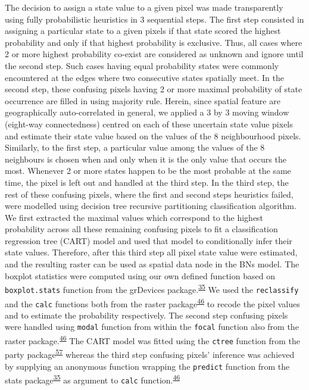 \documentclass[12pt,oneside]{article}
\begin{document}
The decision to assign a state value to a given pixel was made
transparently using fully probabilistic heuristics in 3 sequential
steps. The first step consisted in assigning a particular state to a
given pixels if that state scored the highest probability and only if
that highest probability is exclusive. Thus, all cases where 2 or more
highest probability co-exist are considered as unknown and ignore until
the second step. Such cases having equal probability states were
commonly encountered at the edges where two consecutive states spatially
meet. In the second step, these confusing pixels having 2 or more
maximal probability of state occurrence are filled in using majority
rule. Herein, since spatial feature are geographically auto-correlated
in general, we applied a 3 by 3 moving window (eight-way connectedness)
centred on each of these uncertain state value pixels and estimate their
state value based on the values of the 8 neighbourhood pixels.
Similarly, to the first step, a particular value among the values of the
8 neighbours is chosen when and only when it is the only value that
occurs the most. Whenever 2 or more states happen to be the most
probable at the same time, the pixel is left out and handled at the
third step. In the third step, the rest of these confusing pixels, where
the first and second steps heuristics failed, were modelled using
decision tree recursive partitioning classification algorithm. We first
extracted the maximal values which correspond to the highest probability
across all these remaining confusing pixels to fit a classification
regression tree (CART) model and used that model to conditionally infer
their state values. Therefore, after this third step all pixel state
value were estimated, and the resulting raster can be used as spatial
data node in the BNs model. The boxplot statistics were computed using
our own defined function based on \texttt{boxplot.stats} function from
the grDevices
package.\textsuperscript{\protect\hyperlink{ref-RCoreTeam_2018}{35}} We
used the \texttt{reclassify} and the \texttt{calc} functions both from
the raster
package\textsuperscript{\protect\hyperlink{ref-Hijmans_2019}{46}} to
recode the pixel values and to estimate the probability respectively.
The second step confusing pixels were handled using \texttt{modal}
function from within the \texttt{focal} function also from the raster
package.\textsuperscript{\protect\hyperlink{ref-Hijmans_2019}{46}} The
CART model was fitted using the \texttt{ctree} function from the party
package\textsuperscript{\protect\hyperlink{ref-Hothorn_et_al_2006}{57}}
whereas the third step confusing pixels' inference was achieved by
supplying an anonymous function wrapping the \texttt{predict} function
from the stats
package\textsuperscript{\protect\hyperlink{ref-RCoreTeam_2018}{35}} as
argument to \texttt{calc}
function.\textsuperscript{\protect\hyperlink{ref-Hijmans_2019}{46}}
\end{document}
